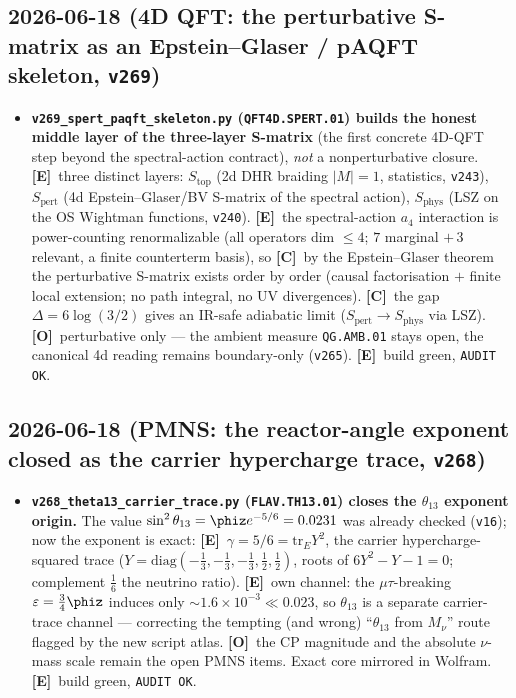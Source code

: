 \documentclass[11pt]{article}
\providecommand{\mE}{\textbf{[E]}}\providecommand{\mC}{\textbf{[C]}}
\providecommand{\mO}{\textbf{[O]}}\providecommand{\mX}{\textbf{[X]}}
\providecommand{\vref}[1]{\texttt{#1}}
\begin{document}
\subsection*{2026-06-18 (4D QFT: the perturbative S-matrix as an Epstein--Glaser / pAQFT skeleton, \texttt{v269})}
\begin{itemize}
\item \textbf{\texttt{v269\_spert\_paqft\_skeleton.py} (\texttt{QFT4D.SPERT.01}) builds the honest middle
  layer of the three-layer S-matrix} (the first concrete 4D-QFT step beyond the spectral-action contract),
  \emph{not} a nonperturbative closure. \mE\ three distinct layers: $S_{\mathrm{top}}$ (2d DHR braiding
  $|M|{=}1$, statistics, \vref{v243}), $S_{\mathrm{pert}}$ (4d Epstein--Glaser/BV S-matrix of the spectral
  action), $S_{\mathrm{phys}}$ (LSZ on the OS Wightman functions, \vref{v240}). \mE\ the spectral-action
  $a_4$ interaction is power-counting renormalizable (all operators dim $\le4$; $7$ marginal $+\,3$ relevant,
  a finite counterterm basis), so \mC\ by the Epstein--Glaser theorem the perturbative S-matrix exists order
  by order (causal factorisation $+$ finite local extension; no path integral, no UV divergences). \mC\ the
  gap $\Delta=6\log(3/2)$ gives an IR-safe adiabatic limit ($S_{\mathrm{pert}}\to S_{\mathrm{phys}}$ via LSZ).
  \mO\ perturbative only --- the ambient measure \texttt{QG.AMB.01} stays open, the canonical 4d reading
  remains boundary-only (\vref{v265}). \mE\ build green, \texttt{AUDIT OK}.
\end{itemize}

\subsection*{2026-06-18 (PMNS: the reactor-angle exponent closed as the carrier hypercharge trace, \texttt{v268})}
\begin{itemize}
\item \textbf{\texttt{v268\_theta13\_carrier\_trace.py} (\texttt{FLAV.TH13.01}) closes the $\theta_{13}$
  exponent origin.} The value $\sin^2\theta_{13}=\phiz e^{-5/6}=0.0231$ was already checked (\vref{v16}); now
  the exponent is exact: \mE\ $\gamma=5/6=\mathrm{tr}_E Y^2$, the carrier hypercharge-squared trace
  ($Y=\mathrm{diag}(-\tfrac13,-\tfrac13,-\tfrac13,\tfrac12,\tfrac12)$, roots of $6Y^2-Y-1=0$; complement
  $\tfrac16$ the neutrino ratio). \mE\ own channel: the $\mu\tau$-breaking $\varepsilon=\tfrac34\phiz$
  induces only ${\sim}1.6\times10^{-3}\ll0.023$, so $\theta_{13}$ is a separate carrier-trace channel ---
  correcting the tempting (and wrong) ``$\theta_{13}$ from $M_\nu$'' route flagged by the new script atlas.
  \mO\ the CP magnitude and the absolute $\nu$-mass scale remain the open PMNS items. Exact core mirrored in
  Wolfram. \mE\ build green, \texttt{AUDIT OK}.
\end{itemize}
\end{document}
